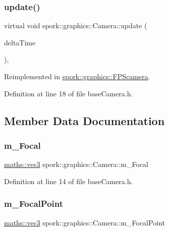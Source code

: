 \subsubsection{\texorpdfstring{update()}{update()}}
{\footnotesize\ttfamily virtual void spork\+::graphics\+::\+Camera\+::update (\begin{DoxyParamCaption}\item[{G\+Lfloat}]{delta\+Time }\end{DoxyParamCaption})\hspace{0.3cm}{\ttfamily [inline]}, {\ttfamily [virtual]}}



Reimplemented in \hyperlink{classspork_1_1graphics_1_1_f_p_scamera_afbb0ac172ef7ab075cc5ff2131c203b3}{spork\+::graphics\+::\+F\+P\+Scamera}.



Definition at line 18 of file base\+Camera.\+h.



\subsection{Member Data Documentation}
\mbox{\label{classspork_1_1graphics_1_1_camera_a24198bdbc3219e9a0da4f718faf5c7bd}} 
\subsubsection{\texorpdfstring{m\+\_\+\+Focal}{m\_Focal}}
{\footnotesize\ttfamily \hyperlink{structspork_1_1maths_1_1vec3}{maths\+::vec3} spork\+::graphics\+::\+Camera\+::m\+\_\+\+Focal\hspace{0.3cm}{\ttfamily [protected]}}



Definition at line 14 of file base\+Camera.\+h.

\mbox{\label{classspork_1_1graphics_1_1_camera_a88aabacaa44ca722d257bd8b1b7e8411}} 
\subsubsection{\texorpdfstring{m\+\_\+\+Focal\+Point}{m\_FocalPoint}}
{\footnotesize\ttfamily \hyperlink{structspork_1_1maths_1_1vec3}{maths\+::vec3} spork\+::graphics\+::\+Camera\+::m\+\_\+\+Focal\+Point\hspace{0.3cm}{\ttfamily [protected]}}



